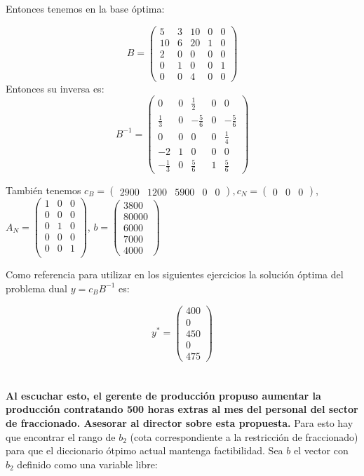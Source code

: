 \documentclass[10pt,a4paper]{article}
\begin{document}
Entonces tenemos en la base óptima:

\[B = \begin{pmatrix}
	5  & 3 & 10 & 0 & 0 \\
	10 & 6 & 20 & 1 & 0 \\
	2  & 0 & 0  & 0 & 0 \\
	0  & 1 & 0  & 0 & 1 \\
	0  & 0 & 4  & 0 & 0
\end{pmatrix}\]
Entonces su inversa es:
\[B^{-1} = \begin{pmatrix}
	0  & 0 &\frac{1}{2} & 0 & 0 \\
	\frac{1}{3} & 0 & -\frac{5}{6} & 0 & -\frac{5}{6} \\
	0  & 0 & 0  & 0 & \frac{1}{4} \\
	-2 & 1 & 0  & 0 & 0 \\
	-\frac{1}{3}  & 0 & \frac{5}{6}  & 1 & \frac{5}{6}
\end{pmatrix}\]

También tenemos $c_B = \begin{pmatrix} 2900 & 1200 & 5900 & 0 & 0 \end{pmatrix}, c_N = \begin{pmatrix} 0 & 0 & 0 \end{pmatrix}$, $A_N = \begin{pmatrix}
	1 & 0 & 0 \\
	0 & 0 & 0 \\
	0 & 1 & 0 \\
	0 & 0 & 0 \\
	0 & 0 & 1 \\
\end{pmatrix}$, $b = \begin{pmatrix}
3800 \\
80000 \\
6000 \\
7000 \\
4000
\end{pmatrix}$

Como referencia para utilizar en los siguientes ejercicios la solución óptima del problema dual $y=c_B B^{-1}$ es:

$$
y^* = \begin{pmatrix}
	400 \\
	0 \\
	450 \\
	0 \\
	475
\end{pmatrix}
$$

\section{} %
\textbf{Al escuchar esto, el gerente de producción propuso aumentar la producción contratando 500 horas extras al mes del personal del sector de fraccionado. Asesorar al director sobre esta propuesta.}
Para esto hay que encontrar el rango de $b_2$ (cota correspondiente a la restricción de fraccionado) para que el diccionario ótpimo actual mantenga factibilidad. Sea $b$ el vector con $b_2$ definido como una variable libre:
\end{document}
